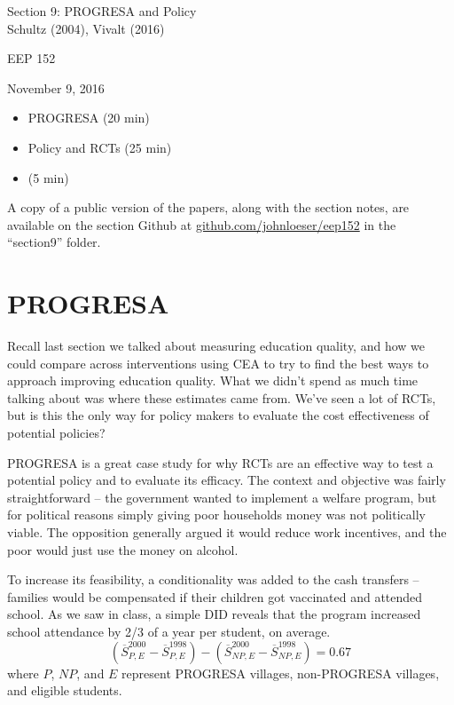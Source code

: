 \documentclass[12pt,english]{article}
\begin{document}
\begin{center}
{\Large{}Section 9: PROGRESA and Policy} \\
{\large{}Schultz (2004), Vivalt (2016)}
\par\end{center}{\Large \par}

\begin{center}
EEP 152
\par\end{center}

\begin{center}
November 9, 2016
\par\end{center}

\begin{itemize}
	\setlength\itemsep{-0.5em}
	\item PROGRESA (20 min)
	\item Policy and RCTs (25 min)
	\item (5 min)
\end{itemize}
A copy of a public version of the papers, along with the section notes, are available on the section Github at \href{github.com/johnloeser/eep152}{github.com/johnloeser/eep152} in the ``section9'' folder.

\section{PROGRESA}

Recall last section we talked about measuring education quality, and how we could compare across interventions using CEA to try to find the best ways to approach improving education quality. What we didn't spend as much time talking about was where these estimates came from. We've seen a lot of RCTs, but is this the only way for policy makers to evaluate the cost effectiveness of potential policies?

PROGRESA is a great case study for why RCTs are an effective way to test a potential policy and to evaluate its efficacy. The context and objective was fairly straightforward -- the government wanted to implement a welfare program, but for political reasons simply giving poor households money was not politically viable. The opposition generally argued it would reduce work incentives, and the poor would just use the money on alcohol.

To increase its feasibility, a conditionality was added to the cash transfers -- families would be compensated if their children got vaccinated and attended school. As we saw in class, a simple DID reveals that the program increased school attendance by 2/3 of a year per student, on average.
$$ \left( \overline{S}^{2000}_{P,E} - \overline{S}^{1998}_{P,E} \right) - \left( \overline{S}^{2000}_{NP,E} - \overline{S}^{1998}_{NP,E} \right) = 0.67 $$
where $P$, $NP$, and $E$ represent PROGRESA villages, non-PROGRESA villages, and eligible students.
\end{document}
